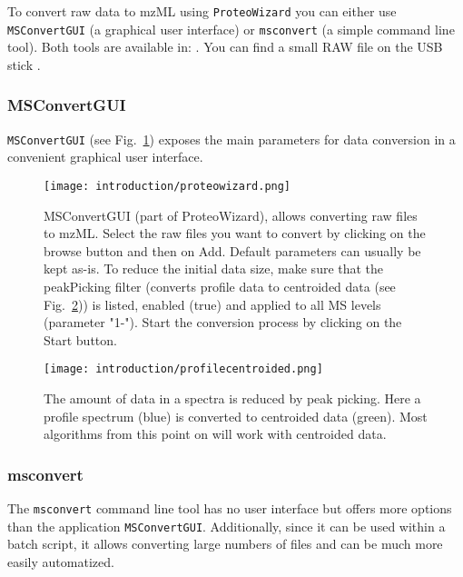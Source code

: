 
\noindent To convert raw data to mzML using \texttt{ProteoWizard} you can either use \texttt{MSConvertGUI} (a graphical user interface) or \texttt{msconvert} (a simple command line tool). Both tools are available in:
\newline
\directory{\WindowsDefaultPWizFolder}.
You can find a small RAW file on the USB stick .

\subsubsection{MSConvertGUI}
\texttt{MSConvertGUI} (see Fig.~\ref{fig:MSConvertGUI}) exposes the main parameters for data conversion in a convenient graphical user interface.

\begin{figure}
\centering
\texttt{[image: introduction/proteowizard.png]}
\caption{MSConvertGUI (part of ProteoWizard), allows converting raw files to mzML. Select the raw files you want to convert by clicking on the browse button and then on Add. Default parameters can usually be kept as-is. To reduce the initial data size, make sure that the peakPicking filter (converts profile data to centroided data (see Fig.~\ref{fig:ProfileCentroidData})) is listed, enabled (true) and applied to all MS levels (parameter "1-"). Start the conversion process by clicking on the Start button.}
\label{fig:MSConvertGUI}
\end{figure}

\begin{figure}
\centering
\texttt{[image: introduction/profilecentroided.png]}
\caption{The amount of data in a spectra is reduced by peak picking. Here a profile spectrum (blue) is converted to centroided data (green). Most algorithms  from this point on will work with centroided data.}
\label{fig:ProfileCentroidData}
\end{figure}

\subsubsection{msconvert}
The \texttt{msconvert} command line tool has no user interface but offers more options than the application \texttt{MSConvertGUI}. Additionally, since it can be used within a batch script, it allows converting large numbers of files and can be much more easily automatized.

